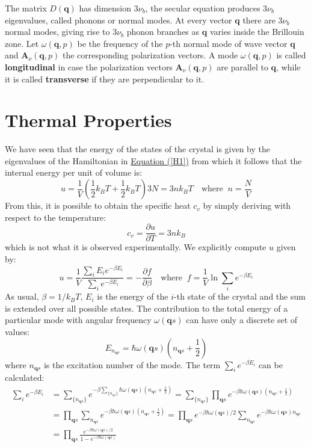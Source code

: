 \documentclass[10.75pt,a4paper,openright,bottom=2cm]{article}
\renewcommand{\Vec}[1]{\boldsymbol{#1}}
\begin{document}
The matrix $D(\Vec{q})$ has dimension $3\nu_b$, the secular equation produces $3\nu_b$ eigenvalues, called phonons or normal modes. At every vector $\Vec{q}$ there are $3\nu_b$ normal modes, giving rise to $3\nu_b$ phonon branches as $\Vec{q}$ varies inside the  Brillouin zone. Let $\omega(\Vec{q},p)$ be the frequency of the $p$-th normal mode of wave vector $\Vec{q}$ and $\Vec{A}_\nu(\Vec{q},p)$ the corresponding polarization vectors. A mode $\omega(\Vec{q},p)$ is called \textbf{longitudinal} in case the polarization vectors $\Vec{A}_\nu(\Vec{q},p)$ are parallel to $\Vec{q}$, while it is called \textbf{transverse} if they are perpendicular to it.
\section{Thermal Properties}
We have seen that the energy of the states of the crystal is given by the eigenvalues of the Hamiltonian in \hyperref[H1]{Equation (\ref{H1})} from which it follows that the internal energy per unit of volume is:
\[
u=\frac{1}{V}\left(\frac{1}{2}k_BT+\frac{1}{2}k_BT\right)3N=3nk_BT \quad \text{where}\;\;n=\frac{N}{V}
\]
From this, it is possible to obtain the specific heat $c_v$ by simply deriving with respect to the temperature:
\[
c_v=\frac{\partial u}{\partial T}=3nk_B
\]
which is not what it is observed experimentally. We explicitly compute $u$ given by:
\[
u=\frac{1}{V}\frac{\sum_iE_ie^{-\beta E_i}}{\sum_ie^{-\beta E_i}}=-\frac{\partial f}{\partial\beta} \quad \text{where}\;\;f=\frac{1}{V}\ln{\sum_ie^{-\beta E_i}}
\]
As usual, $\beta=1/k_BT$, $E_i$ is the energy of the $i$-th state of the crystal and the sum is extended over all possible states. The contribution to the total energy of a particular mode with angular frequency $\omega(\Vec{q}s)$ can have only a discrete set of values:
\[
E_{n_{\Vec{q}s}}=\hbar\omega(\Vec{q}s)\left(n_{\Vec{q}s}+\frac{1}{2}\right)
\]
where $n_{\Vec{q}s}$ is the excitation number of the mode. The term $\sum_ie^{-\beta E_i}$ can be calculated:
\begin{align*}
\sum_ie^{-\beta E_i}&=\sum_{\{n_{\Vec{q}s}\}}e^{-\beta\sum_{\{n_{\Vec{q}s}\}}\hbar\omega(\Vec{q}s)\left(n_{\Vec{q}s}+\frac{1}{2}\right)}=\sum_{\{n_{\Vec{q}s}\}}\prod_{\Vec{q}s}e^{-\beta\hbar\omega(\Vec{q}s)\left(n_{\Vec{q}s}+\frac{1}{2}\right)}\\
&=\prod_{\Vec{q}s}\sum_{n_{\Vec{q}s}}e^{-\beta\hbar\omega(\Vec{q}s)\left(n_{\Vec{q}s}+\frac{1}{2}\right)}=\prod_{\Vec{q}s}e^{-\beta\hbar\omega(\Vec{q}s)/2}\sum_{n_{\Vec{q}s}}e^{-\beta\hbar\omega(\Vec{q}s)n_{\Vec{q}s}}\\
&=\prod_{\Vec{q}s}\frac{e^{-\beta\hbar\omega(\Vec{q}s)/2}}{1-e^{-\beta\hbar\omega(\Vec{q}s)}}
\end{align*}
\end{document}
